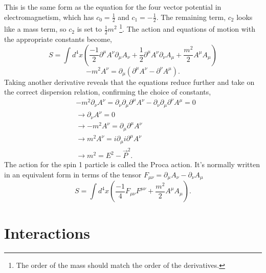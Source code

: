 This is the same form as the equation for the four vector potential in electromagnetism, which has $c_0 = \frac{1}{2}$ and $c_1 =-\frac{1}{2}$. The remaining term, $c_2$ looks like a mass term, so $c_2$ is set to $\frac{1}{2}m^2$ \footnote{The order of the mass should match the order of the derivatives.}. The action and equations of motion with the appropriate constants become, 
\begin{equation}
S = \int d^4x \left( \frac{-1}{2} \partial^\mu A^\nu\partial_\mu A_\nu + \frac{1}{2} \partial^\mu A^\nu\partial_\nu A_\mu + \frac{m^2}{2} A^\mu A_\mu \right)
\end{equation}
\begin{equation}
-m^2 A^\nu = \partial_\mu\left(\partial^\mu A^\nu - \partial^\nu A^\mu\right).
\end{equation}
Taking another derivative reveals that the equations reduce further and take on the correct dispersion relation, confirming the choice of constants,
\begin{equation}
\begin{split}
&-m^2 \partial_\nu A^\nu = \partial_\nu \partial_\mu \partial^\mu A^\nu - \partial_\nu \partial_\mu \partial^\nu A^\mu = 0 \\
&\rightarrow \partial_\nu A^\nu = 0 \\
&\rightarrow -m^2 A^\nu = \partial_\mu\partial^\mu A^\nu \\
&\rightarrow m^2 A^\nu = i\partial_\mu i\partial^\mu A^\nu \\
&\rightarrow m^2 = E^2 - \vec{P}^2.
\end{split}
\end{equation}
The action for the spin 1 particle is called the Proca action. It's normally written in an equivalent form in terms of the tensor $F_{\mu\nu} = \partial_\mu A_\nu - \partial_\nu A_\mu$
\begin{equation}
S = \int d^4x \left( \frac{-1}{4}F_{\mu\nu}F^{\mu\nu}  + \frac{m^2}{2} A^\mu A_\mu \right).
\end{equation}


\section{Interactions}

